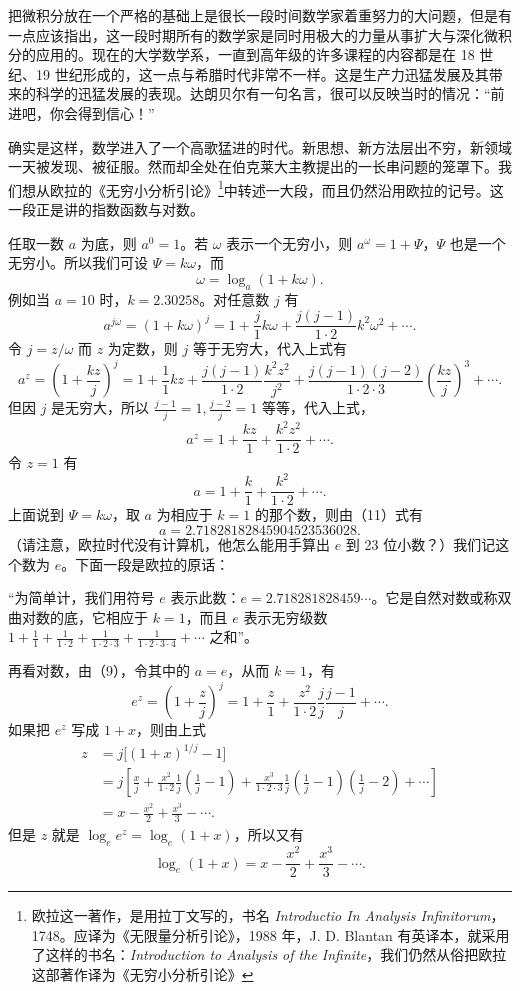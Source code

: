 把微积分放在一个严格的基础上是很长一段时间数学家着重努力的大问题，但是有一点应该指出，这一段时期所有的数学家是同时用极大的力量从事扩大与深化微积分的应用的。现在的大学数学系，一直到高年级的许多课程的内容都是在 18 世纪、19 世纪形成的，这一点与希腊时代非常不一样。这是生产力迅猛发展及其带来的科学的迅猛发展的表现。达朗贝尔有一句名言，很可以反映当时的情况：“前进吧，你会得到信心！”

确实是这样，数学进入了一个高歌猛进的时代。新思想、新方法层出不穷，新领域一天被发现、被征服。然而却全处在伯克莱大主教提出的一长串问题的笼罩下。我们想从欧拉的《无穷小分析引论》\footnote{欧拉这一著作，是用拉丁文写的，书名 \textit{Introductio In Analysis Infinitorum}，1748。应译为《无限量分析引论》，1988 年，J. D. Blantan 有英译本，就采用了这样的书名：\textit{Introduction to Analysis of the Infinite}，我们仍然从俗把欧拉这部著作译为《无穷小分析引论》}中转述一大段，而且仍然沿用欧拉的记号。这一段正是讲的指数函数与对数。

任取一数 $a$ 为底，则 $a^0=1$。若 $\omega$ 表示一个无穷小，则 $a^\omega=1+\Psi$，$\Psi$ 也是一个无穷小。所以我们可设 $\Psi=k\omega$，而
\[
\omega=\log_a(1+k\omega). \tag{8}
\]
例如当 $a=10$ 时，$k=2.30258$。对任意数 $j$ 有
\[
a^{j\omega}=(1+k\omega)^j
=1+\frac{j}{1}k\omega+\frac{j(j-1)}{1\cdot2}k^2\omega^2+\cdots.
\]
令 $j=z/\omega$ 而 $z$ 为定数，则 $j$ 等于无穷大，代入上式有
\[
a^z=\left(1+\frac{kz}{j}\right)^j
=1+\frac{1}{1}kz+\frac{j(j-1)}{1\cdot2}\frac{k^2z^2}{j^2}
+\frac{j(j-1)(j-2)}{1\cdot2\cdot3}\left(\frac{kz}{j}\right)^3+\cdots. \tag{9}
\]
但因 $j$ 是无穷大，所以 $\frac{j-1}{j}=1,\frac{j-2}{j}=1$ 等等，代入上式，
\[
a^z=1+\frac{kz}{1}+\frac{k^2z^2}{1\cdot2}+\cdots. \tag{10}
\]
令 $z=1$ 有
\[
a=1+\frac{k}{1}+\frac{k^2}{1\cdot2}+\cdots. \tag{11}
\]
上面说到 $\Psi=k\omega$，取 $a$ 为相应于 $k=1$ 的那个数，则由（11）式有
\[
a=2.71828182845904523536028. \tag{12}
\]
（请注意，欧拉时代没有计算机，他怎么能用手算出 $e$ 到 23 位小数？）我们记这个数为 $e$。下面一段是欧拉的原话：

“为简单计，我们用符号 $e$ 表示此数：$e=2.718281828459\cdots$。它是自然对数或称双曲对数的底，它相应于 $k=1$，而且 $e$ 表示无穷级数 $1+\frac11+\frac1{1\cdot2}+\frac1{1\cdot2\cdot3}+\frac1{1\cdot2\cdot3\cdot4}+\cdots$ 之和”。

再看对数，由（9），令其中的 $a=e$，从而 $k=1$，有
\[
e^z=\left(1+\frac{z}{j}\right)^j
=1+\frac{z}{1}+\frac{z^2}{1\cdot2}\frac{j}{j}\frac{j-1}{j}+\cdots. \tag{13}
\]
如果把 $e^z$ 写成 $1+x$，则由上式
\[
\begin{aligned}
z&=j\big[(1+x)^{1/j}-1\big]\\
&=j\left[\frac{x}{j}+\frac{x^2}{1\cdot2}\frac1j\left(\frac1j-1\right)
+\frac{x^3}{1\cdot2\cdot3}\frac1j\left(\frac1j-1\right)\left(\frac1j-2\right)+\cdots\right]\\
&=x-\frac{x^2}{2}+\frac{x^3}{3}-\cdots.
\end{aligned}
\]
但是 $z$ 就是 $\log_e e^z=\log_e(1+x)$，所以又有
\[
\log_e(1+x)=x-\frac{x^2}{2}+\frac{x^3}{3}-\cdots. \tag{14}
\]

